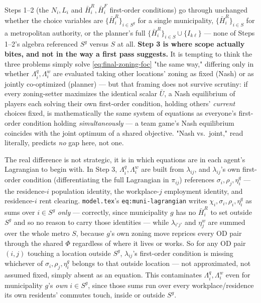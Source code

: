 \documentclass[12pt, a4paper]{article}
\theoremstyle{definition}
\begin{document}
Steps 1--2 (the $N_i,L_i$ and $\bar H_i^R,\bar H_i^F$ first-order conditions) go through unchanged whether the choice variables are $\{\bar H_i^R\}_{i\in S^g}$ for a single municipality, $\{\bar H_i^R\}_{i\in S}$ for a metropolitan authority, or the planner's full $\{\bar H_i^R\}_{i\in S}\cup\{I_{k\ell}\}$ — none of Steps 1--2's algebra referenced $S^g$ versus $S$ at all. \textbf{Step 3 is where scope actually bites, and not in the way a first pass suggests.} It is tempting to think the three problems simply solve \eqref{eq:final-zoning-foc} "the same way," differing only in whether $\Lambda_i^q,\Lambda_i^w$ are evaluated taking other locations' zoning as fixed (Nash) or as jointly co-optimized (planner) — but that framing does not survive scrutiny: if every zoning-setter maximizes the identical scalar $\bar U$, a Nash equilibrium of players each solving their own first-order condition, holding others' \emph{current} choices fixed, is mathematically the same system of equations as everyone's first-order condition holding \emph{simultaneously} — a team game's Nash equilibrium coincides with the joint optimum of a shared objective. "Nash vs.\ joint," read literally, predicts \emph{no} gap here, not one.

The real difference is not strategic, it is in which equations are in each agent's Lagrangian to begin with. In Step 3, $\Lambda_i^q,\Lambda_i^w$ are built from $\lambda_{ij}$, and $\lambda_{ij}$'s own first-order condition (differentiating the full Lagrangian in $\pi_{ij}$) references $\sigma_i,\rho_j,\eta_i^q$ — the residence-$i$ population identity, the workplace-$j$ employment identity, and residence-$i$ rent clearing. \texttt{model.tex}'s \texttt{eq:muni-lagrangian} writes $\chi_i,\sigma_i,\rho_i,\eta_i^q$ as sums over $i\in S^g$ \emph{only} — correctly, since municipality $g$ has no $\bar H_i^R$ to set outside $S^g$ and so no reason to carry those identities — while $\lambda_{i'j'}$ and $\eta_j^w$ are summed over the whole metro $S$, because $g$'s own zoning move reprices every OD pair through the shared $\Phi$ regardless of where it lives or works. So for any OD pair $(i,j)$ touching a location outside $S^g$, $\lambda_{ij}$'s first-order condition is missing whichever of $\sigma_i,\rho_j,\eta_i^q$ belongs to that outside location — not approximated, not assumed fixed, simply absent as an equation. This contaminates $\Lambda_i^q,\Lambda_i^w$ even for municipality $g$'s \emph{own} $i\in S^g$, since those sums run over every workplace/residence its own residents' commutes touch, inside or outside $S^g$.
\end{document}

